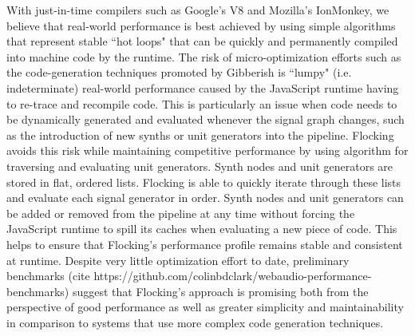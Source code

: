 \documentclass{article}
\begin{document}
With just-in-time compilers such as Google's V8 and Mozilla's IonMonkey, we believe that real-world performance is best achieved by using simple algorithms that represent stable ``hot loops" that can be quickly and permanently  compiled into machine code by the runtime. The risk of micro-optimization efforts such as the code-generation techniques promoted by Gibberish is ``lumpy" (i.e. indeterminate) real-world performance caused by the JavaScript runtime having to re-trace and recompile code. This is particularly an issue when code needs to be dynamically generated and evaluated whenever the signal graph changes, such as the introduction of new synths or unit generators into the pipeline. Flocking avoids this risk while maintaining competitive performance by using algorithm for traversing and evaluating unit generators. Synth nodes and unit generators are stored in flat, ordered lists. Flocking is able to quickly iterate through these lists and evaluate each signal generator in order. Synth nodes and unit generators can be added or removed from the pipeline at any time without forcing the JavaScript runtime to spill its caches when evaluating a new piece of code. This helps to ensure that Flocking's performance profile remains stable and consistent at runtime. Despite very little optimization effort to date, preliminary benchmarks (cite https://github.com/colinbdclark/webaudio-performance-benchmarks) suggest that Flocking's approach is promising both from the perspective of good performance as well as greater simplicity and maintainability in comparison to systems that use more complex code generation techniques.




\end{document}
